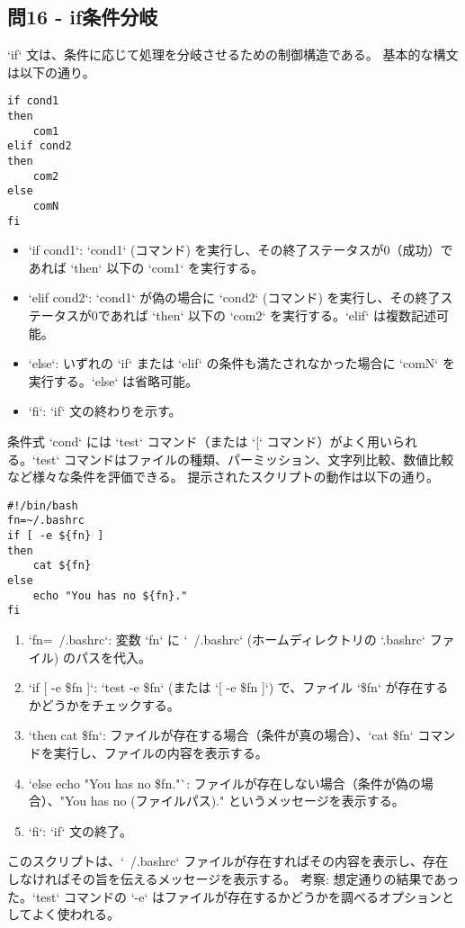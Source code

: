 \documentclass[a4paper,11pt]{jsarticle}
\begin{document}
\subsection*{問16 - if条件分岐}
`if` 文は、条件に応じて処理を分岐させるための制御構造である。
基本的な構文は以下の通り。
\begin{lstlisting}[caption=問16 if文の構文]
if cond1
then
    com1
elif cond2
then
    com2
else
    comN
fi
\end{lstlisting}
\begin{itemize}
    \item `if cond1`: `cond1` (コマンド) を実行し、その終了ステータスが0（成功）であれば `then` 以下の `com1` を実行する。
    \item `elif cond2`: `cond1` が偽の場合に `cond2` (コマンド) を実行し、その終了ステータスが0であれば `then` 以下の `com2` を実行する。`elif` は複数記述可能。
    \item `else`: いずれの `if` または `elif` の条件も満たされなかった場合に `comN` を実行する。`else` は省略可能。
    \item `fi`: `if` 文の終わりを示す。
\end{itemize}
条件式 `cond` には `test` コマンド（または `[` コマンド）がよく用いられる。`test` コマンドはファイルの種類、パーミッション、文字列比較、数値比較など様々な条件を評価できる。
提示されたスクリプトの動作は以下の通り。
\begin{lstlisting}[caption=問16のスクリプト例]
#!/bin/bash
fn=~/.bashrc
if [ -e ${fn} ]
then
    cat ${fn}
else
    echo "You has no ${fn}."
fi
\end{lstlisting}
\begin{enumerate}
    \item `fn=~/.bashrc`: 変数 `fn` に `~/.bashrc` (ホームディレクトリの `.bashrc` ファイル) のパスを代入。
    \item `if [ -e \${fn} ]`: `test -e \${fn}` (または `[ -e \${fn} ]`) で、ファイル `\${fn}` が存在するかどうかをチェックする。
    \item `then cat \${fn}`: ファイルが存在する場合（条件が真の場合）、`cat \${fn}` コマンドを実行し、ファイルの内容を表示する。
    \item `else echo "You has no \${fn}."`: ファイルが存在しない場合（条件が偽の場合）、"You has no (ファイルパス)." というメッセージを表示する。
    \item `fi`: `if` 文の終了。
\end{enumerate}
このスクリプトは、`~/.bashrc` ファイルが存在すればその内容を表示し、存在しなければその旨を伝えるメッセージを表示する。
考察: 想定通りの結果であった。`test` コマンドの `-e` はファイルが存在するかどうかを調べるオプションとしてよく使われる。
\end{document}
